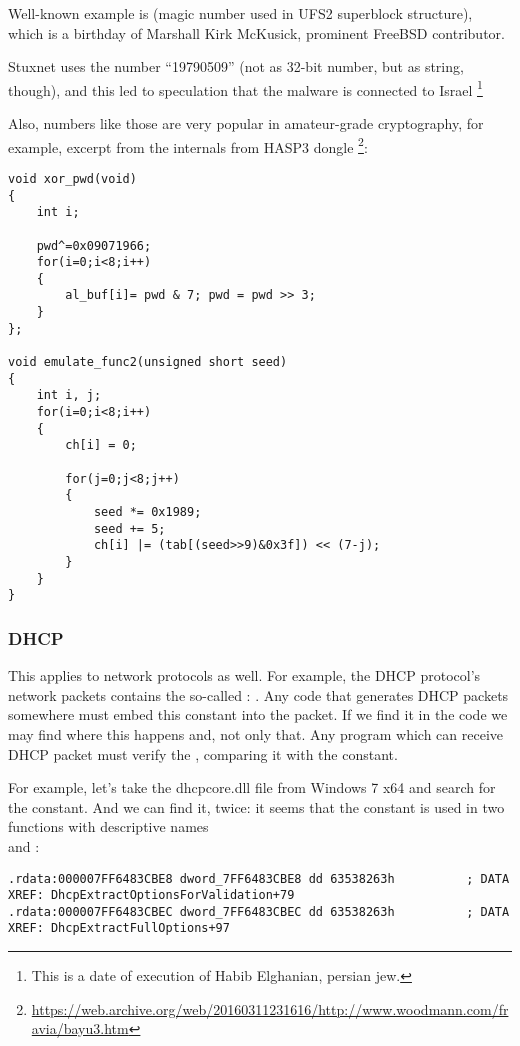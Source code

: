 Well-known example is  (magic number used in UFS2 superblock structure), which is a birthday of Marshall Kirk McKusick, prominent FreeBSD contributor.

Stuxnet uses the number ``19790509'' (not as 32-bit number, but as string, though), and this led to speculation
that the malware is connected to Israel
\footnote{This is a date of execution of Habib Elghanian, persian jew.}

Also, numbers like those are very popular in amateur-grade cryptography, for example, excerpt from the  internals from HASP3 dongle
\footnote{\url{https://web.archive.org/web/20160311231616/http://www.woodmann.com/fravia/bayu3.htm}}:

\begin{lstlisting}[style=customc]
void xor_pwd(void) 
{ 
	int i; 
	
	pwd^=0x09071966;
	for(i=0;i<8;i++) 
	{ 
		al_buf[i]= pwd & 7; pwd = pwd >> 3; 
	} 
};

void emulate_func2(unsigned short seed)
{ 
	int i, j; 
	for(i=0;i<8;i++) 
	{ 
		ch[i] = 0; 
		
		for(j=0;j<8;j++)
		{ 
			seed *= 0x1989; 
			seed += 5; 
			ch[i] |= (tab[(seed>>9)&0x3f]) << (7-j); 
		}
	} 
}
\end{lstlisting}

\subsubsection{DHCP}

This applies to network protocols as well.
For example, the DHCP protocol's network packets contains the so-called : .
Any code that generates DHCP packets somewhere must embed this constant into the packet.
If we find it in the code we may find where this happens and, not only that.
Any program which can receive DHCP packet must verify the , comparing it with the constant.

For example, let's take the dhcpcore.dll file from Windows 7 x64 and search for the constant.
And we can find it, twice:
it seems that the constant is used in two functions with descriptive names\\
 and :

\begin{lstlisting}[caption=dhcpcore.dll (Windows 7 x64),style=customasm]
.rdata:000007FF6483CBE8 dword_7FF6483CBE8 dd 63538263h          ; DATA XREF: DhcpExtractOptionsForValidation+79
.rdata:000007FF6483CBEC dword_7FF6483CBEC dd 63538263h          ; DATA XREF: DhcpExtractFullOptions+97
\end{lstlisting}

